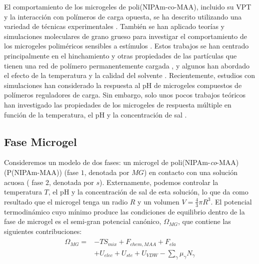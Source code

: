 El comportamiento de los microgeles de poli(NIPAm-co-MAA), incluido su VPT y la interacci\'on con pol\'imeros de carga opuesta, se ha descrito utilizando una variedad de t\'ecnicas experimentales .
Tambi\'en se han aplicado teor\'ias  y simulaciones moleculares de grano grueso para investigar el comportamiento de los microgeles polim\'ericos sensibles a est\'imulos .
Estos trabajos se han centrado principalmente en el hinchamiento y otras propiedades de las part\'iculas que tienen una red de pol\'imero permanentemente cargada , y algunos han abordado el efecto de la temperatura y la calidad del solvente .
Recientemente, estudios  con simulaciones han considerado la respuesta al pH de microgeles compuestos de pol\'imeros reguladores de carga.
Sin embargo, solo unos pocos trabajos te\'oricos han investigado las propiedades de los microgeles de respuesta m\'ultiple en funci\'on de la temperatura, el pH y la concentración de sal .


\subsection{Fase Microgel}\label{sec:theory}


Consideremos un modelo de dos fases: un microgel de poli(NIPAm-\emph{co}-MAA) (P(NIPAm-MAA)) (fase $1$, denotada por $MG$) en contacto con una soluci\'on acuosa ( fase $2$, denotada por $s$).
Externamente, podemos controlar la temperatura $T$, el pH y la concentraci\'on de sal de esta soluci\'on, lo que da como resultado que el microgel tenga un radio $R$ y un volumen $V=\frac{4}{3}\pi R^3$.
El potencial termodin\'amico cuyo m\'inimo produce las condiciones de equilibrio dentro de la fase de microgel es el semi-gran potencial can\'onico, $\Omega_{MG}$, que contiene las siguientes contribuciones:
%
\begin{align}
    \begin{aligned}
       \Omega_{MG}=& -TS_{mix} + F_{chem,MAA} +  F_{ela}\\
       & + U_{elec}+  U_{ste} + U_{VDW} -{\sum_{\gamma}
        {\mu_\gamma N_\gamma}}
    \end{aligned}
    \label{eq:free-energy-implicit}
\end{align}
%

